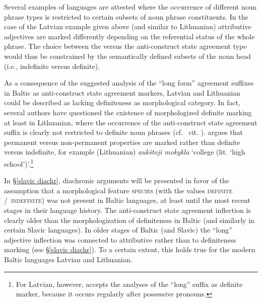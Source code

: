 Several examples of languages are attested where the occurrence of different noun phrase types is restricted to certain subsets of noun phrase constituents. In the case of the Latvian example given above (and similar to Lithuanian) attributive adjectives are marked differently depending on the referential status of the whole phrase. The choice between the  versus the anti\hyp{}construct state agreement type would thus be constrained by the semantically defined subsets of the noun head (i.e., indefinite versus definite). 

As a consequence of the suggested analysis of the “long form” agreement suffixes in Baltic as anti\hyp{}construct state agreement markers, Latvian and Lithuanian could be described as lacking definiteness as morphological category. In fact, several authors have questioned the existence of morphologized definite marking at least in Lithuanian, where the occurrence of the anti\hyp{}construct state agreement suffix is clearly not restricted to definite noun phrases (cf.~\citealt{wissemann1958} cit. \citealt[181–182]{kramsky1972}). \citet[37]{trost1966} argues that permanent versus non-permanent properties are marked rather than definite versus indefinite, for example (Lithuanian) \textit{aukštoji mokykla} ‘college (lit. ‘high school’)’.\footnote{For Latvian, however, \citet[38]{trost1966} accepts the analyses of the “long” suffix as definite marker, because it occurs regularly after possessive pronouns.}

In \S\ref{slavic diachr}, diachronic arguments will be presented in favor of the assumption that a morphological feature \textsc{species} (with the values \textsc{definite} /~\textsc{indefinite}) was not present in Baltic languages, at least until the most recent stages in their language history. The anti\hyp{}construct state agreement inflection is clearly older than the morphologization of definiteness in Baltic (and similarly in certain Slavic languages). In older stages of Baltic (and Slavic) the “long” adjective inflection was connected to attributive rather than to definiteness marking (see \S\ref{slavic diachr}). To a certain extent, this holds true for the modern Baltic languages Latvian and Lithuanian.

